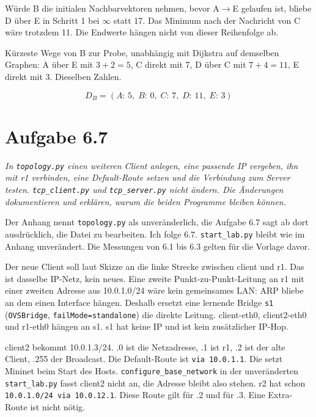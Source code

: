 \documentclass[a4paper,11pt]{article}
\newif\ifexplain
\newcommand{\aufgabe}[1]{\section*{Aufgabe #1}}
\newcommand{\angabe}[1]{{\raggedright\textit{#1}\par}\smallskip}
\newcommand{\explain}[1]{\ifexplain\begin{erklbox}#1\end{erklbox}\fi}
\begin{document}
Würde B die initialen Nachbarvektoren nehmen, bevor A\(\to\)E gelaufen ist, bliebe D über E in Schritt 1 bei \(\infty\) statt 17. Das Minimum nach der Nachricht von C wäre trotzdem 11. Die Endwerte hängen nicht von dieser Reihenfolge ab.

Kürzeste Wege von B zur Probe, unabhängig mit Dijkstra auf demselben Graphen: A über E mit \(3+2=5\), C direkt mit 7, D über C mit \(7+4=11\), E direkt mit 3. Dieselben Zahlen.

\explain{Die Spalte ist nicht der Distanzvektor des Nachbarn, sondern Kosten bis zum Nachbarn plus dessen Distanz zum Ziel. Deshalb kann in der Spalte ein Umweg stehen, den B nie wählt. 17 nach D über E ist so ein Umweg: E hat D nur über A gemeldet, und A hängt mit 12 an D. Sobald C seine direkte 4 meldet, fällt das Minimum auf 11. Split Horizon ist hier nicht dabei. Die Aufgabe verlangt den reinen Distance-Vector.}
\[\boxed{D_B=(A{:}\,5,\; B{:}\,0,\; C{:}\,7,\; D{:}\,11,\; E{:}\,3)}\]

\aufgabe{6.7}
\angabe{In \texttt{topology.py} einen weiteren Client anlegen, eine passende IP vergeben, ihn mit r1 verbinden, eine Default-Route setzen und die Verbindung zum Server testen. \texttt{tcp\_client.py} und \texttt{tcp\_server.py} nicht ändern. Die Änderungen dokumentieren und erklären, warum die beiden Programme bleiben können.}
Der Anhang nennt \texttt{topology.py} als unveränderlich, die Aufgabe 6.7 sagt ab dort ausdrücklich, die Datei zu bearbeiten. Ich folge 6.7. \texttt{start\_lab.py} bleibt wie im Anhang unverändert. Die Messungen von 6.1 bis 6.3 gelten für die Vorlage davor.

Der neue Client soll laut Skizze an die linke Strecke zwischen client und r1. Das ist dasselbe IP-Netz, kein neues. Eine zweite Punkt-zu-Punkt-Leitung an r1 mit einer zweiten Adresse aus 10.0.1.0/24 wäre kein gemeinsames LAN: ARP bliebe an dem einen Interface hängen. Deshalb ersetzt eine lernende Bridge \texttt{s1} (\texttt{OVSBridge}, \texttt{failMode=standalone}) die direkte Leitung. client-eth0, client2-eth0 und r1-eth0 hängen an s1. s1 hat keine IP und ist kein zusätzlicher IP-Hop.

client2 bekommt 10.0.1.3/24. .0 ist die Netzadresse, .1 ist r1, .2 ist der alte Client, .255 der Broadcast. Die Default-Route ist \texttt{via 10.0.1.1}. Die setzt Mininet beim Start des Hosts. \texttt{configure\_base\_network} in der unveränderten \texttt{start\_lab.py} fasst client2 nicht an, die Adresse bleibt also stehen. r2 hat schon \texttt{10.0.1.0/24 via 10.0.12.1}. Diese Route gilt für .2 und für .3. Eine Extra-Route ist nicht nötig.
\end{document}
